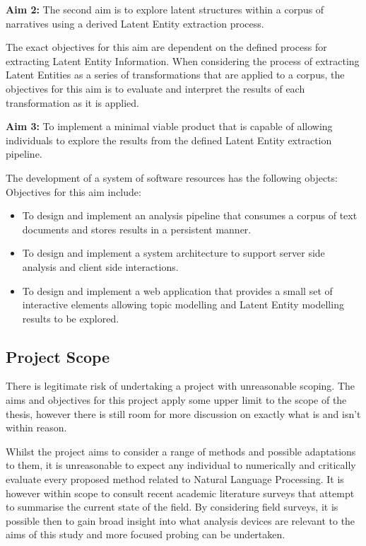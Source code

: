 \documentclass[10pt]{report}
\begin{document}
\textbf{Aim 2:} The second aim is to explore latent structures within a corpus of narratives using a derived Latent Entity extraction process.

The exact objectives for this aim are dependent on the defined process for extracting Latent Entity Information. When considering the process of extracting Latent Entities as a series of transformations that are applied to a corpus, the objectives for this aim is to evaluate and interpret the results of each transformation as it is applied.

\textbf{Aim 3:} To implement a minimal viable product that is capable of allowing individuals to explore the results from the defined Latent Entity extraction pipeline.

The development of a system of software resources has the following objects:
\renewcommand{\baselinestretch}{1.0}\normalsize
Objectives for this aim include:
\begin{itemize}
\item To design and implement an analysis pipeline that consumes a corpus of text documents and stores results in a persistent manner.
\item To design and implement a system architecture to support server side analysis and client side interactions.
\item To design and implement a web application that provides a small set of interactive elements allowing topic modelling and Latent Entity modelling results to be explored.
\end{itemize}
\renewcommand{\baselinestretch}{2.0}\normalsize

\subsection{Project Scope}
There is legitimate risk of undertaking a project with unreasonable scoping. The aims and objectives for this project apply some upper limit to the scope of the thesis, however there is still room for more discussion on exactly what is and isn't within reason.

Whilst the project aims to consider a range of methods and possible adaptations to them, it is unreasonable to expect any individual to numerically and critically evaluate every proposed method related to Natural Language Processing. It is however within scope to consult recent academic literature surveys that attempt to summarise the current state of the field. By considering field surveys, it is possible then to gain broad insight into what analysis devices are relevant to the aims of this study and more focused probing can be undertaken.
\end{document}
